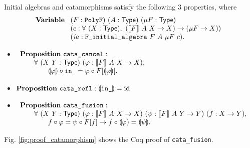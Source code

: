 \documentclass[runningheads, orivec]{llncs}
\begin{document}
Initial algebras and catamorphisms satisfy the following 3 properties, where
\[
\mathbf{Variable}~\begin{array}[t]{l}
(F : \verb~PolyF~) ~ (A : \mathsf{Type}) ~ ( \mu F : \mathsf{Type}) \\
(c : \forall ~ (X : \mathsf{Type}), ~ (\llbracket F \rrbracket ~ A ~ X \to X) \to (\mu F \to X) ) \\
(\mathit{ia} : \verb~F_initial_algebra~ ~ F ~ A ~ \mu F ~ c).
\end{array}
\]
\begin{itemize}
\item \(
\begin{array}[t]{l}
\mathbf{Proposition}~\verb~cata_cancel~ : \\
\qquad \forall ~ (X~Y : \mathsf{Type}) ~ (\varphi : \llbracket F \rrbracket ~ A ~ X \to X), \\
\qquad\qquad \llparenthesis \varphi \rrparenthesis \circ \verb~in_~ = \varphi \circ F[\llparenthesis \varphi \rrparenthesis].
\end{array}
\)

\item \(\mathbf{Proposition}~\verb~cata_refl~ : \llparenthesis \verb~in_~ \rrparenthesis = \mathrm{id}\)

\item \(
\begin{array}[t]{l}
\mathbf{Proposition}~\verb~cata_fusion~ : \\
\qquad \forall ~ (X~Y : \mathsf{Type}) ~ (\varphi : \llbracket F \rrbracket ~ A ~ X \to X) ~ (\psi : \llbracket F \rrbracket ~ A ~ Y \to Y) ~ (f : X \to Y ), \\
\qquad\qquad f \circ \varphi = \psi \circ F[f] \to f \circ \llparenthesis \varphi \rrparenthesis = \llparenthesis \psi \rrparenthesis.
\end{array}
\)
\end{itemize}
Fig. \ref{fig:proof_catamorphism} shows the Coq proof of \verb~cata_fusion~. 
\end{document}

